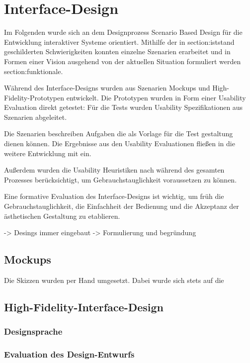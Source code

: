 \chapter{Interface-Design}
\label{chapter-design}
Im Folgenden wurde sich an dem Designprozess Scenario Based Design für die Entwicklung interaktiver
Systeme orientiert. Mithilfe der in \refname{section:iststand} geschilderten Schwierigkeiten konnten
einzelne Szenarien erarbeitet und in Formen einer Vision ausgehend von der aktuellen Situation
formuliert werden \refname{section:funktionale}.

Während des Interface-Designs wurden aus Szenarien Mockups und High-Fidelity-Prototypen entwickelt.
Die Prototypen wurden in Form einer Usability Evaluation direkt getestet: Für die Tests wurden
Usability Spezifikationen aus Szenarien abgeleitet.

Die Szenarien beschreiben Aufgaben die als Vorlage für die Test gestaltung dienen können. Die
Ergebnisse aus den Usability Evaluationen fließen in die weitere Entwicklung mit ein.

Außerdem wurden die Usability Heuristiken nach  während des gesamten
Prozesses berücksichtigt, um Gebrauchstauglichkeit voraussetzen zu können.

Eine formative Evaluation des Interface-Designs ist wichtig, um früh die Gebrauchstauglichkeit,
die Einfachheit der Bedienung und die Akzeptanz der ästhetischen Gestaltung zu etablieren.


-> Desings immer eingebaut -> Formulierung und begründung
\section{Mockups}
Die Skizzen wurden per Hand umgesetzt. Dabei wurde sich stets auf die 
\section{High-Fidelity-Interface-Design}
\subsection{Designsprache}


\subsection{Evaluation des Design-Entwurfs}


